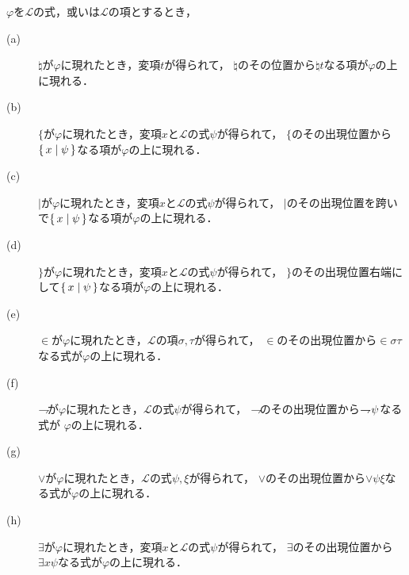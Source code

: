 	\begin{screen}
		\begin{metathm}
		\label{metathm:existence_of_scopes_L}
			$\varphi$を$\mathcal{L}$の式，或いは$\mathcal{L}$の項とするとき，
			\begin{description}
				\item[(a)] $\natural$が$\varphi$に現れたとき，変項$t$が得られて，
					$\natural$のその位置から$\natural t$なる項が$\varphi$の上に現れる．
					
				\item[(b)] $\{$が$\varphi$に現れたとき，変項$x$と$\mathcal{L}$の式$\psi$が得られて，
					$\{$のその出現位置から$\{\, x \mid \psi\, \}$なる項が$\varphi$の上に現れる．
					
				\item[(c)] $|$が$\varphi$に現れたとき，変項$x$と$\mathcal{L}$の式$\psi$が得られて，
					$|$のその出現位置を跨いで$\{\, x \mid \psi\, \}$なる項が$\varphi$の上に現れる．
					
				\item[(d)] $\}$が$\varphi$に現れたとき，変項$x$と$\mathcal{L}$の式$\psi$が得られて，
					$\}$のその出現位置右端にして$\{\, x \mid \psi\, \}$なる項が$\varphi$の上に現れる．
					
				\item[(e)] $\in$が$\varphi$に現れたとき，$\mathcal{L}$の項$\sigma,\tau$が得られて，
					$\in$のその出現位置から$\in \sigma \tau$なる式が$\varphi$の上に現れる．
				
				\item[(f)] $\rightharpoondown\hspace{-0.25em}$が$\varphi$に現れたとき，$\mathcal{L}$の式$\psi$が得られて，
					$\rightharpoondown\hspace{-0.25em}$のその出現位置から$\rightharpoondown\hspace{-0.25em} \psi$なる式が
					$\varphi$の上に現れる．	
				
				\item[(g)] $\vee$が$\varphi$に現れたとき，$\mathcal{L}$の式$\psi,\xi$が得られて，
					$\vee$のその出現位置から$\vee \psi \xi$なる式が$\varphi$の上に現れる．
				
				\item[(h)] $\exists$が$\varphi$に現れたとき，変項$x$と$\mathcal{L}$の式$\psi$が得られて，
					$\exists$のその出現位置から$\exists x \psi$なる式が$\varphi$の上に現れる．
			\end{description}
		\end{metathm}
	\end{screen}
	
